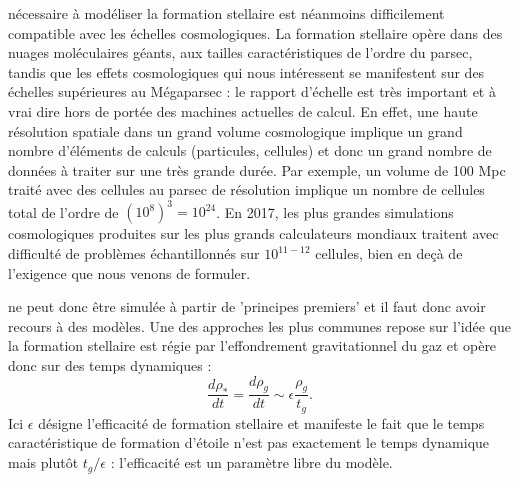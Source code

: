  nécessaire à modéliser la formation stellaire est néanmoins difficilement compatible avec les échelles cosmologiques. La formation stellaire opère dans des nuages moléculaires géants, aux tailles caractéristiques de l'ordre du parsec, tandis que les effets cosmologiques qui nous intéressent se manifestent sur des échelles supérieures au Mégaparsec : le rapport d'échelle est très important et à vrai dire hors de portée des machines actuelles de calcul. En effet, une haute résolution spatiale dans un grand volume cosmologique implique un grand nombre d'éléments de calculs (particules, cellules) et donc un grand nombre de données à traiter sur une très grande durée. Par exemple, un volume de 100 Mpc traité avec des cellules au parsec de résolution implique un nombre de cellules total de l'ordre de $(10^8)^3=10^{24}$. En 2017, les plus grandes simulations cosmologiques produites sur les plus grands calculateurs mondiaux traitent avec difficulté de problèmes échantillonnés sur $10^{11-12}$ cellules, bien en deçà de l'exigence que nous venons de formuler.

 ne peut donc être simulée à partir de 'principes premiers' et il faut donc avoir recours à des modèles. Une des approches les plus communes repose sur l'idée que la formation stellaire est régie par l'effondrement gravitationnel du gaz et opère donc sur des temps dynamiques :
\begin{equation}
\frac{d \rho_*}{dt}=\frac{d \rho_g}{dt}\sim\epsilon\frac{\rho_g}{t_g}.
\end{equation}
Ici $\epsilon$ désigne l'efficacité de formation stellaire et manifeste le fait que le temps caractéristique de formation d'étoile n'est pas exactement le temps dynamique mais plutôt $t_g/\epsilon$ : l'efficacité est un paramètre libre du modèle.

